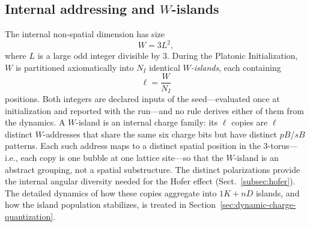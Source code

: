 \documentclass{ijuc}
\begin{document}
\subsection{Internal addressing and $W$-islands}\label{subsec:w-islands}
The internal non-spatial dimension has size
\begin{equation}
W=3L^{2},
\end{equation}
where $L$ is a large odd integer divisible by $3$.
During the Platonic Initialization, $W$ is partitioned axiomatically into $N_{I}$ identical \emph{$W$-islands}, each containing
\begin{equation}
\ell=\frac{W}{N_{I}}
\end{equation}
positions.  Both integers are declared inputs of the seed---evaluated once at initialization and reported with the run---and no rule derives either of them from the dynamics.
A $W$-island is an internal charge family: its $\ell$ copies are $\ell$ distinct $W$-addresses that share the same six charge bits but have distinct $pB$/$sB$ patterns.  Each such address maps to a distinct spatial position in the 3-torus---i.e., each copy is one bubble at one lattice site---so that the $W$-island is an abstract grouping, not a spatial substructure.
The distinct polarizations provide the internal angular diversity needed for the Hofer effect (Sect.~\ref{subsec:hofer}).
The detailed dynamics of how these copies aggregate into $1K+nD$ islands, and how the island population stabilizes, is treated in Section~\ref{sec:dynamic-charge-quantization}.
\end{document}
